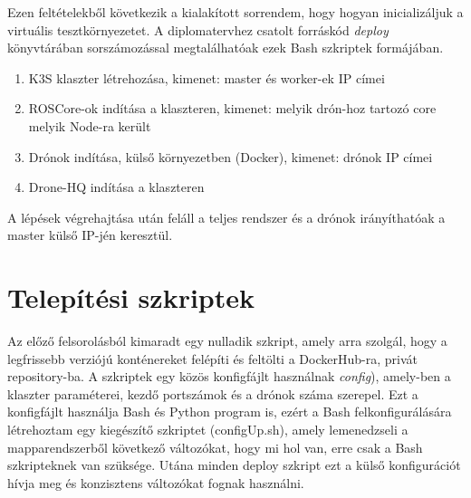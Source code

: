 \noindent
Ezen feltételekből következik a kialakított sorrendem, hogy hogyan inicializáljuk a virtuális tesztkörnyezetet. A diplomatervhez csatolt forráskód \emph{deploy} könyvtárában sorszámozással megtalálhatóak ezek Bash szkriptek formájában.

\begin{enumerate}
	\item K3S klaszter létrehozása, kimenet: master és worker-ek IP címei
	\item ROSCore-ok indítása a klaszteren, kimenet: melyik drón-hoz tartozó core melyik Node-ra került
	\item Drónok indítása, külső környezetben (Docker), kimenet: drónok IP címei
	\item Drone-HQ indítása a klaszteren
\end{enumerate}
A lépések végrehajtása után feláll a teljes rendszer és a drónok irányíthatóak a master külső IP-jén keresztül.

\section{Telepítési szkriptek}
Az előző felsorolásból kimaradt egy nulladik szkript, amely arra szolgál, hogy a legfrissebb verziójú konténereket felépíti és feltölti a DockerHub-ra, privát repository-ba. A szkriptek egy közös konfigfájlt használnak \emph{config}), amely-ben a klaszter paraméterei, kezdő portszámok és a drónok száma szerepel. Ezt a konfigfájlt használja Bash és Python program is, ezért a Bash felkonfigurálására létrehoztam egy kiegészítő szkriptet (configUp.sh), amely lemenedzseli a mapparendszerből következő változókat, hogy mi hol van, erre csak a Bash szkripteknek van szüksége. Utána minden deploy szkript ezt a külső konfigurációt hívja meg és konzisztens változókat fognak használni. \\

